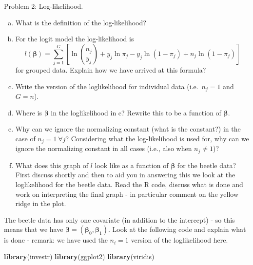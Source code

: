 \documentclass[
  ignorenonframetext,
]{beamer}
\newenvironment{Shaded}{\begin{snugshade}}{\end{snugshade}}
\newcommand{\FunctionTok}[1]{\textcolor[rgb]{0.13,0.29,0.53}{\textbf{#1}}}
\newcommand{\NormalTok}[1]{#1}
\begin{document}
\begin{frame}[fragile]
\begin{block}{Problem 2: Log-likelihood.}
\protect\hypertarget{problem-2-log-likelihood.}{}
\begin{enumerate}
[a)]
\item
  What is the definition of the log-likelihood?
\item
  For the logit model the log-likelihood is
  \[l(\boldsymbol{\beta})=\sum_{j=1}^G[\ln \binom{n_j}{y_j}+ y_j \ln \pi_j-y_j\ln(1-\pi_j)+n_j\ln(1-\pi_j)]\]
  for grouped data. Explain how we have arrived at this formula?
\item
  Write the version of the loglikelihood for individual data
  (i.e.~\(n_j=1\) and \(G=n\)).
\item
  Where is \(\boldsymbol{\beta}\) in the loglikelihood in c? Rewrite
  this to be a function of \(\boldsymbol{\beta}\).
\item
  Why can we ignore the normalizing constant (what is the constant?) in
  the case of \(n_j = 1 \ \forall j\)? Considering what the
  log-likelihood is used for, why can we ignore the normalizing constant
  in all cases (i.e., also when \(n_j \neq 1\))?
\item
  What does this graph of \(l\) look like as a function of
  \(\boldsymbol{\beta}\) for the beetle data? First discuss shortly and
  then to aid you in answering this we look at the loglikelihood for the
  beetle data. Read the R code, discuss what is done and work on
  interpreting the final graph - in particular comment on the yellow
  ridge in the plot.
\end{enumerate}

The beetle data has only one covariate (in addition to the intercept) -
so this means that we have
\(\boldsymbol{\beta}=(\boldsymbol{\beta}_0,\boldsymbol{\beta}_1)\). Look
at the following code and explain what is done - remark: we have used
the \(n_i=1\) version of the loglikelihood here.

\begin{Shaded}
\begin{Highlighting}[]
\FunctionTok{library}\NormalTok{(investr)}
\FunctionTok{library}\NormalTok{(ggplot2)}
\FunctionTok{library}\NormalTok{(viridis)}


\end{Highlighting}
\end{Shaded}
\end{block}
\end{frame}
\end{document}
